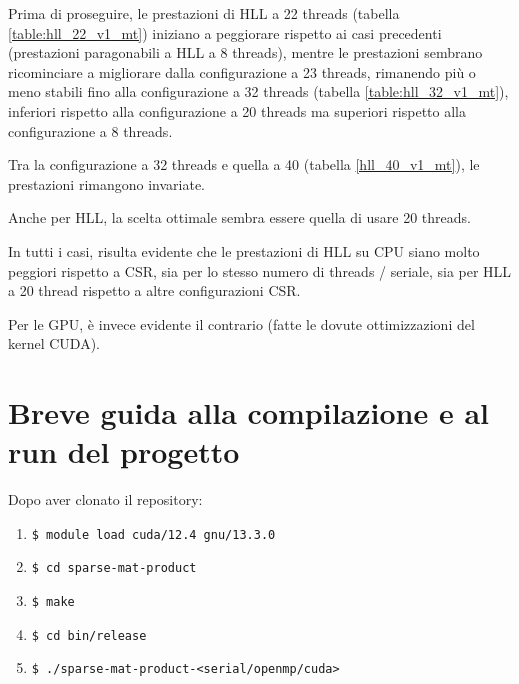 \documentclass[a4paper,9pt]{extarticle}
\begin{document}
Prima di proseguire, le prestazioni di HLL a 22 threads (tabella \ref{table:hll_22_v1_mt}) 
iniziano a peggiorare rispetto ai casi precedenti (prestazioni paragonabili a HLL a 8 threads),
mentre le prestazioni sembrano ricominciare a migliorare dalla configurazione a 23 threads, 
rimanendo più o meno stabili fino alla configurazione a 32 threads (tabella 
\ref{table:hll_32_v1_mt}), inferiori rispetto alla configurazione a 20 threads ma superiori 
rispetto alla configurazione a 8 threads.

Tra la configurazione a 32 threads e quella a 40 (tabella \ref{hll_40_v1_mt}), le prestazioni
rimangono invariate.

Anche per HLL, la scelta ottimale sembra essere quella di usare 20 threads.

In tutti i casi, risulta evidente che le prestazioni di HLL su CPU siano molto peggiori rispetto
a CSR, sia per lo stesso numero di threads / seriale, sia per HLL a 20 thread rispetto a altre 
configurazioni CSR.

Per le GPU, è invece evidente il contrario (fatte le dovute ottimizzazioni del kernel CUDA).

\section{Breve guida alla compilazione e al run del progetto}

Dopo aver clonato il repository:

\begin{enumerate}
	\item 
\begin{lstlisting}
$ module load cuda/12.4 gnu/13.3.0
\end{lstlisting}

	\item 
\begin{lstlisting}
$ cd sparse-mat-product
\end{lstlisting}

	\item 
\begin{lstlisting}
$ make
\end{lstlisting}

	\item 
\begin{lstlisting}
$ cd bin/release
\end{lstlisting}

	\item 
\begin{lstlisting}
$ ./sparse-mat-product-<serial/openmp/cuda>
\end{lstlisting}
\end{enumerate}
\end{document}
